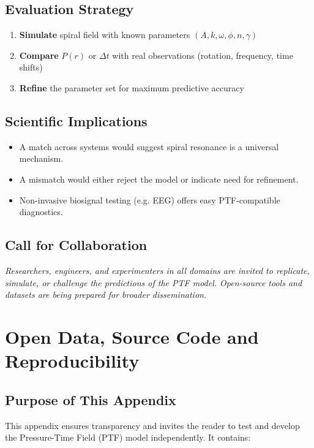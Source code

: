 \documentclass[a4paper,12pt]{article}
\begin{document}
\subsection{Evaluation Strategy}

\begin{enumerate}
    \item \textbf{Simulate} spiral field with known parameters $(A, k, \omega, \phi, n, \gamma)$
    \item \textbf{Compare} $P(r)$ or $\Delta t$ with real observations (rotation, frequency, time shifts)
    \item \textbf{Refine} the parameter set for maximum predictive accuracy
\end{enumerate}

\subsection{Scientific Implications}

\begin{itemize}
    \item A match across systems would suggest spiral resonance is a universal mechanism.
    \item A mismatch would either reject the model or indicate need for refinement.
    \item Non-invasive biosignal testing (e.g. EEG) offers easy PTF-compatible diagnostics.
\end{itemize}

\subsection{Call for Collaboration}

\noindent
\textit{Researchers, engineers, and experimenters in all domains are invited to replicate, simulate, or challenge the predictions of the PTF model.  
Open-source tools and datasets are being prepared for broader dissemination.}

\appendix
\section{Open Data, Source Code and Reproducibility}

\subsection{Purpose of This Appendix}

This appendix ensures transparency and invites the reader to test and develop the Pressure-Time Field (PTF) model independently. It contains:
\end{document}
